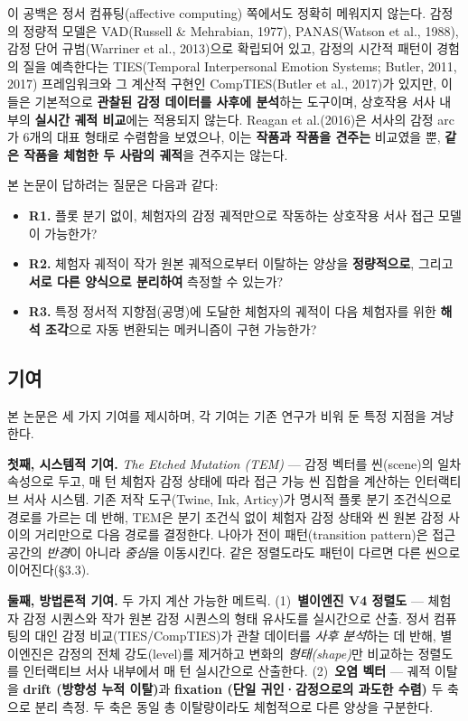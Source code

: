 \documentclass[11pt, a4paper]{article}
\begin{document}
이 공백은 정서 컴퓨팅(affective computing) 쪽에서도 정확히 메워지지 않는다. 감정의 정량적 모델은 VAD(Russell \& Mehrabian, 1977), PANAS(Watson et al., 1988), 감정 단어 규범(Warriner et al., 2013)으로 확립되어 있고, 감정의 시간적 패턴이 경험의 질을 예측한다는 TIES(Temporal Interpersonal Emotion Systems; Butler, 2011, 2017) 프레임워크와 그 계산적 구현인 CompTIES(Butler et al., 2017)가 있지만, 이들은 기본적으로 \textbf{관찰된 감정 데이터를 사후에 분석}하는 도구이며, 상호작용 서사 내부의 \textbf{실시간 궤적 비교}에는 적용되지 않는다. Reagan et al.(2016)은 서사의 감정 arc가 6개의 대표 형태로 수렴함을 보였으나, 이는 \textbf{작품과 작품을 견주는} 비교였을 뿐, \textbf{같은 작품을 체험한 두 사람의 궤적}을 견주지는 않는다.

본 논문이 답하려는 질문은 다음과 같다:
\begin{itemize}
  \item \textbf{R1.} 플롯 분기 없이, 체험자의 감정 궤적만으로 작동하는 상호작용 서사 접근 모델이 가능한가?
  \item \textbf{R2.} 체험자 궤적이 작가 원본 궤적으로부터 이탈하는 양상을 \textbf{정량적으로}, 그리고 \textbf{서로 다른 양식으로 분리하여} 측정할 수 있는가?
  \item \textbf{R3.} 특정 정서적 지향점(공명)에 도달한 체험자의 궤적이 다음 체험자를 위한 \textbf{해석 조각}으로 자동 변환되는 메커니즘이 구현 가능한가?
\end{itemize}

\subsection{기여}

본 논문은 세 가지 기여를 제시하며, 각 기여는 기존 연구가 비워 둔 특정 지점을 겨냥한다.

\textbf{첫째, 시스템적 기여.} \textit{The Etched Mutation (TEM)} --- 감정 벡터를 씬(scene)의 일차 속성으로 두고, 매 턴 체험자 감정 상태에 따라 접근 가능 씬 집합을 계산하는 인터랙티브 서사 시스템. 기존 저작 도구(Twine, Ink, Articy)가 명시적 플롯 분기 조건식으로 경로를 가르는 데 반해, TEM은 분기 조건식 없이 체험자 감정 상태와 씬 원본 감정 사이의 거리만으로 다음 경로를 결정한다. 나아가 전이 패턴(transition pattern)은 접근 공간의 \textit{반경}이 아니라 \textit{중심}을 이동시킨다. 같은 정렬도라도 패턴이 다르면 다른 씬으로 이어진다(\S3.3).

\textbf{둘째, 방법론적 기여.} 두 가지 계산 가능한 메트릭. (1)~\textbf{별이엔진 V4 정렬도} --- 체험자 감정 시퀀스와 작가 원본 감정 시퀀스의 형태 유사도를 실시간으로 산출. 정서 컴퓨팅의 대인 감정 비교(TIES/CompTIES)가 관찰 데이터를 \textit{사후 분석}하는 데 반해, 별이엔진은 감정의 전체 강도(level)를 제거하고 변화의 \textit{형태(shape)}만 비교하는 정렬도를 인터랙티브 서사 내부에서 매 턴 실시간으로 산출한다. (2)~\textbf{오염 벡터} --- 궤적 이탈을 \textbf{drift (방향성 누적 이탈)}과 \textbf{fixation (단일 귀인·감정으로의 과도한 수렴)} 두 축으로 분리 측정. 두 축은 동일 총 이탈량이라도 체험적으로 다른 양상을 구분한다.
\end{document}
